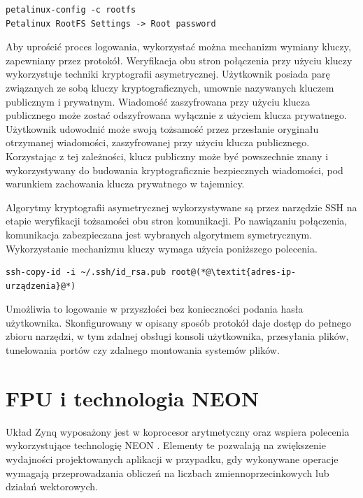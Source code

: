 \begin{lstlisting}[breaklines=true]
petalinux-config -c rootfs
Petalinux RootFS Settings -> Root password
\end{lstlisting}

Aby uprościć proces logowania, wykorzystać można mechanizm wymiany kluczy, zapewniany przez protokół. Weryfikacja obu stron połączenia przy użyciu kluczy wykorzystuje techniki kryptografii asymetrycznej. Użytkownik posiada parę związanych ze sobą kluczy kryptograficznych, umownie nazywanych kluczem publicznym i prywatnym. Wiadomość zaszyfrowana przy użyciu klucza publicznego może zostać odszyfrowana wyłącznie z użyciem klucza prywatnego. Użytkownik udowodnić może swoją tożsamość przez przesłanie oryginału otrzymanej wiadomości, zaszyfrowanej przy użyciu klucza publicznego.
Korzystając z tej zależności, klucz publiczny może być powszechnie znany i wykorzystywany do budowania kryptograficznie bezpiecznych wiadomości, pod warunkiem zachowania klucza prywatnego w tajemnicy.

Algorytmy kryptografii asymetrycznej wykorzystywane są przez narzędzie SSH na etapie weryfikacji tożsamości obu stron komunikacji. 
Po nawiązaniu połączenia, komunikacja zabezpieczana jest wybranych algorytmem symetrycznym. 
Wykorzystanie mechanizmu kluczy wymaga użycia poniższego polecenia.


\begin{lstlisting}[breaklines=true]
ssh-copy-id -i ~/.ssh/id_rsa.pub root@(*@\textit{adres-ip-urządzenia}@*)
\end{lstlisting}

Umożliwia to logowanie w przyszłości bez konieczności podania hasła użytkownika. 
Skonfigurowany w opisany sposób protokół daje dostęp do pełnego zbioru narzędzi, w tym zdalnej obsługi konsoli użytkownika, przesyłania plików, tunelowania portów czy zdalnego montowania systemów plików.

\section{FPU i technologia NEON}

\label{sec:arm-neon}

Układ Zynq wyposażony jest w koprocesor arytmetyczny oraz wspiera polecenia wykorzystujące technologię NEON \cite{neon-home}.
Elementy te pozwalają na zwiększenie wydajności projektowanych aplikacji w przypadku, gdy wykonywane operacje wymagają przeprowadzania obliczeń na liczbach zmiennoprzecinkowych lub działań wektorowych. 

